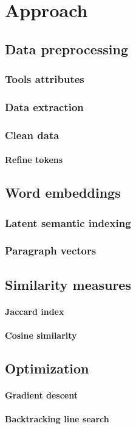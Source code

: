 \chapter{Approach}\label{chap:approach}
\section{Data preprocessing}
    \subsection{ Tools attributes}
    \subsection{Data extraction}
    \subsection{Clean data}
    \subsubsection{Refine tokens}
\section{Word embeddings}
    \subsection{Latent semantic indexing}
    \subsection{Paragraph vectors}
\section{Similarity measures}
    \subsubsection{Jaccard index}
    \subsubsection{Cosine similarity}

\section{Optimization}
    \subsubsection{Gradient descent}
    \subsubsection{Backtracking line search}